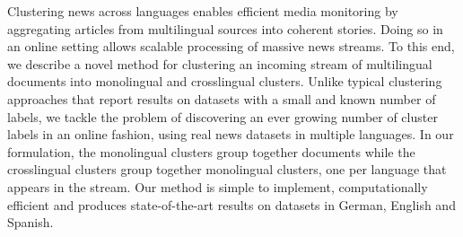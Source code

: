Clustering news across languages enables efficient media monitoring by aggregating articles from multilingual sources into coherent stories. Doing so in an online setting allows scalable processing of massive news streams. To this end, we describe a novel method for clustering an incoming stream of multilingual documents into monolingual and crosslingual clusters. Unlike typical clustering approaches that report results on datasets with a small and known number of labels, we tackle the problem of discovering an ever growing number of cluster labels in an online fashion, using real news datasets in multiple languages. In our formulation, the monolingual clusters group together documents while the crosslingual clusters group together monolingual clusters, one per language that appears in the stream. Our method is simple to implement, computationally efficient and produces state-of-the-art results on datasets in German, English and Spanish.
